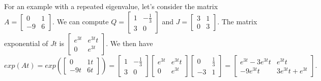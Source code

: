 For an example with a repeated eigenvalue, let's consider the matrix 
$A=
\begin{bmatrix}
 0 & 1 \\
 -9 & 6
\end{bmatrix}
$.  We can compute 
$Q=
\begin{bmatrix}
 1 & -\frac{1}{3} \\
 3 & 0
\end{bmatrix}
$
and
$J=
\begin{bmatrix}
 3 & 1 \\
 0 & 3
\end{bmatrix}
$. The matrix exponential of $Jt$ is 
$
\begin{bmatrix}
 e^{3 t} & e^{3 t} t \\
 0 & e^{3 t}
\end{bmatrix}
$. We then have
$$exp\left(A t\right) = exp\left(
\begin{bmatrix}
 0 & 1t \\
 -9t & 6t
\end{bmatrix}
\right)
=
\begin{bmatrix}
 1 & -\frac{1}{3} \\
 3 & 0
\end{bmatrix}
\begin{bmatrix}
 e^{3 t} & e^{3 t} t \\
 0 & e^{3 t}
\end{bmatrix}
\begin{bmatrix}
 0 & \frac{1}{3} \\
 -3 & 1
\end{bmatrix}
=
\begin{bmatrix}
 e^{3 t}-3 e^{3 t} t & e^{3 t} t \\
 -9 e^{3 t} t & 3 e^{3 t} t+e^{3 t}
\end{bmatrix}
.
$$

